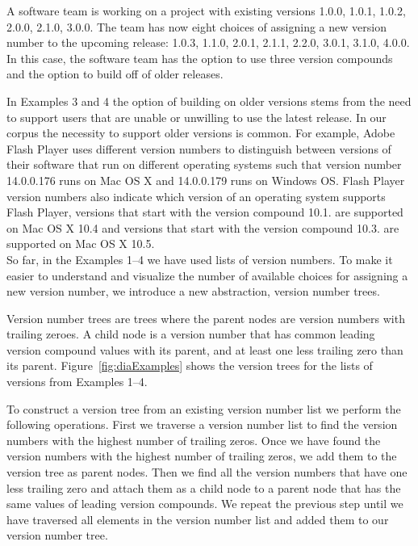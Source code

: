 \documentclass[conference]{IEEEtran}
\begin{document}
  A software team  is working on a project with existing versions 1.0.0, 1.0.1, 1.0.2, 2.0.0, 2.1.0, 3.0.0. 
The team has now eight choices of assigning a new version number to the upcoming release: 
1.0.3, 1.1.0, 2.0.1, 2.1.1, 2.2.0, 3.0.1, 3.1.0, 4.0.0. 
In this case, the software team has the option to use three version compounds and the option to build off of older releases. \\



In Examples 3 and 4 the option of building on older versions stems from the need to support users that are unable or unwilling to use the latest release.
In our corpus the necessity to support older versions is  common. 
For example, Adobe Flash Player uses different version numbers to distinguish between versions of their software that run on different operating systems such that version number 14.0.0.176 runs on Mac OS X and 14.0.0.179 runs on Windows OS.
Flash Player version numbers also indicate which version of an operating system supports Flash Player, versions that start with the version compound 10.1. are supported on Mac OS X 10.4 and versions that start with the version compound 10.3. are supported on Mac OS X 10.5.
\\

So far, in the Examples 1--4 we have used lists of version numbers. To make it easier to understand and visualize the number of available choices for assigning a new version number, we introduce a new abstraction, version number trees.

Version number trees are trees where the parent nodes are version numbers with trailing zeroes. A child node is a version number that has common leading version compound values with its parent, and at least one less trailing zero than its parent.
Figure~\ref{fig:diaExamples} shows the version trees for the lists of versions from Examples 1--4.

To construct a version tree from an existing version number list we perform the following operations.
First we traverse a version number list to find the version numbers with the highest number of trailing zeros.
Once we have found the version numbers with the highest number of trailing zeros, we add them to the version tree as parent nodes.
Then we find all the version numbers that have one less trailing zero and attach them as a child node to a parent node that has the same values of leading version compounds.
We repeat the previous step until we have traversed all elements in the version number list and added them to our version number tree. \\
\end{document}
